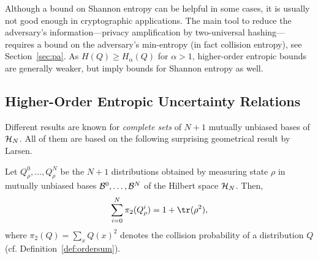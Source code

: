 Although a bound on Shannon entropy can be
helpful in some cases, it is usually not good enough in cryptographic
applications.  The main tool to reduce the adversary's
information---privacy amplification by two-universal
hashing---requires a bound on the adversary's min-entropy (in fact
collision entropy), see Section~\ref{sec:pa}. As $H(Q) \geq
H_\alpha(Q)$ for $\alpha > 1$, higher-order entropic bounds are
generally weaker, but imply bounds for Shannon entropy as well.

\subsection{Higher-Order Entropic Uncertainty Relations}
Different results are known for
\emph{complete sets} of $N+1$ mutually unbiased bases of
$\mathcal{H}_N$. All of them are based on the following surprising
geometrical result by Larsen.
\begin{theorem} \label{thm:larsen}
 Let $Q_\rho^0, \ldots, Q_\rho^N$ be the $N+1$ distributions obtained by
 measuring state $\rho$ in mutually unbiased bases $\mathcal{B}^{0},
 \ldots, \mathcal{B}^{N}$ of the Hilbert space $\mathcal{H}_N$. Then, 
 \begin{equation} \label{eq:larsen}
    \sum_{i=0}^{N} \pi_2(Q_\rho^i) = 1 + \tr(\rho^2),
  \end{equation}
  where $\pi_2(Q)=\sum_x Q(x)^2$ denotes the 
collision probability of a distribution $Q$ (cf.
  Definition~\ref{def:ordersum}).
\end{theorem}

